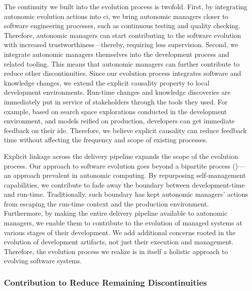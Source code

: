 The continuity we built into the evolution process is twofold. First, by integrating autonomic evolution actions into \gls{ci}, we bring autonomic managers closer to software engineering processes, such as continuous testing and quality checking. Therefore, autonomic managers can start contributing to the software evolution with increased trustworthiness---thereby, requiring less supervision. Second, we integrate autonomic managers themselves into the development process and related tooling. This means that autonomic managers can further contribute to reduce other discontinuities. Since our evolution process integrates software and knowledge changes, we extend the explicit causality property to local development environments. Run-time changes and knowledge discoveries are immediately put in service of stakeholders through the tools they used. For example, based on search space explorations conducted in the development environment, and models reified on production, developers can get immediate feedback on their \gls{ide}. Therefore, we believe explicit causality can reduce feedback time without affecting the frequency and scope of existing processes.

Explicit linkage across the delivery pipeline expands the scope of the evolution process. Our approach to software evolution goes beyond a bipartite process ()---an approach prevalent in autonomic computing. By repurposing self-management capabilities, we contribute to fade away the boundary between development-time and run-time. Traditionally, such boundary has kept autonomic managers' actions from escaping the run-time context and the production environment. Furthermore, by making the entire delivery pipeline available to autonomic managers, we enable them to contribute to the evolution of managed systems at various stages of their development. We add additional concerns rooted in the evolution of development artifacts, not just their execution and management. Therefore, the evolution process we realize is in itself a holistic approach to evolving software systems.

\subsubsection{Contribution to Reduce Remaining Discontinuities}
\label{subsubsect:evaluation--im-remaining-discontinuities}

